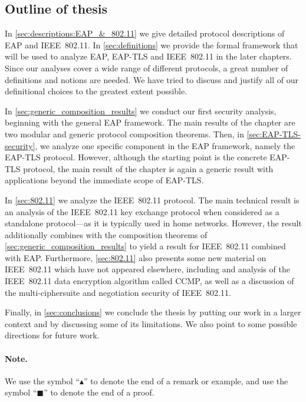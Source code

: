 \subsection{Outline of thesis}

In \cref{sec:descriptions:EAP_&_802.11} we give detailed protocol descriptions of EAP and IEEE~802.11.
In \cref{sec:definitions} we provide the formal framework that will be used to analyze EAP, EAP-TLS and IEEE~802.11 in the later chapters.
Since our analyses cover a wide range of different protocols,
a great number of definitions and notions are needed.
We have tried to discuss and justify all of our definitional choices to the greatest extent possible.


In \cref{sec:generic_composition_results} we conduct our first security analysis,
beginning with the general EAP framework.
The main results of the chapter are two modular and generic protocol composition theorems.
Then,
in \cref{sec:EAP-TLS-security},
we analyze one specific component in the EAP framework,
namely the EAP-TLS protocol. 
However,
although the starting point is the concrete EAP-TLS protocol,
the main result of the chapter is again a generic result with applications beyond the immediate scope of EAP-TLS.

In \cref{sec:802.11} we analyze the IEEE~802.11 protocol.
The main technical result is an analysis of the IEEE~802.11 key exchange protocol when considered as a standalone protocol---as it is typically used in home networks.
However,
the result additionally combines with the composition theorems of \cref{sec:generic_composition_results} to yield a result for IEEE~802.11 combined with EAP. 
Furthermore,
\cref{sec:802.11} also presents some new material on IEEE~802.11 which have not appeared elsewhere,
including and analysis of the IEEE~802.11 data encryption algorithm called CCMP,
as well as a discussion of the multi-ciphersuite and negotiation security of IEEE~802.11.


Finally,
in \cref{sec:conclusions} we conclude the thesis by putting our work in a larger context and by discussing some of its limitations.
We also point to some possible directions for future work.
 

\paragraph{Note.}
We use the symbol ``$\blacktriangle$'' to denote the end of a remark or example,
and use the symbol ``$\blacksquare$'' to denote the end of a proof.